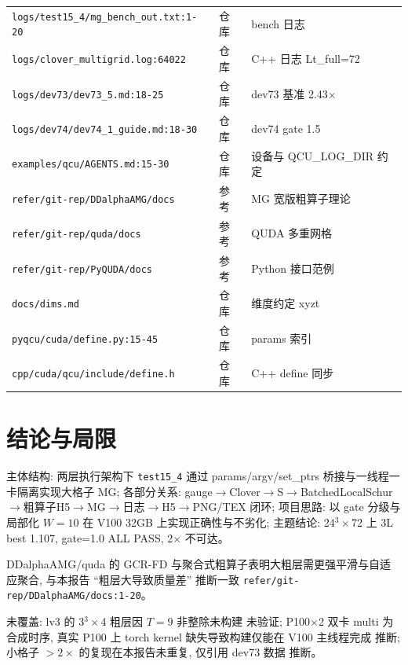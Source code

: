 \documentclass[UTF8]{ctexart}
\begin{document}
\begin{xltabular}{\textwidth}{llX}
\texttt{\nolinkurl{logs/test15_4/mg_bench_out.txt:1-20}} & 仓库 & bench 日志 \\
\texttt{\nolinkurl{logs/clover_multigrid.log:64022}} & 仓库 & C++ 日志 Lt\_full=72 \\
\texttt{\nolinkurl{logs/dev73/dev73_5.md:18-25}} & 仓库 & dev73 基准 2.43$\times$ \\
\texttt{\nolinkurl{logs/dev74/dev74_1_guide.md:18-30}} & 仓库 & dev74 gate 1.5 \\
\texttt{\nolinkurl{examples/qcu/AGENTS.md:15-30}} & 仓库 & 设备与 QCU\_LOG\_DIR 约定 \\
\texttt{\nolinkurl{refer/git-rep/DDalphaAMG/docs}} & 参考 & MG 宽版粗算子理论 \\
\texttt{\nolinkurl{refer/git-rep/quda/docs}} & 参考 & QUDA 多重网格 \\
\texttt{\nolinkurl{refer/git-rep/PyQUDA/docs}} & 参考 & Python 接口范例 \\
\texttt{\nolinkurl{docs/dims.md}} & 仓库 & 维度约定 xyzt \\
\texttt{\nolinkurl{pyqcu/cuda/define.py:15-45}} & 仓库 & params 索引 \\
\texttt{\nolinkurl{cpp/cuda/qcu/include/define.h}} & 仓库 & C++ define 同步 \\
\bottomrule
\end{xltabular}

\section{结论与局限}
\begin{conclbox}
主体结构: 两层执行架构下 \texttt{\nolinkurl{test15_4}} 通过 params/argv/set\_ptrs 桥接与一线程一卡隔离实现大格子 MG; 各部分关系: gauge$\to$Clover$\to$S$\to$BatchedLocalSchur$\to$粗算子H5$\to$MG$\to$日志$\to$H5$\to$PNG/TEX 闭环; 项目思路: 以 gate 分级与局部化 $W=10$ 在 V100 32GB 上实现正确性与不劣化; 主题结论: 24$^3\times$72 上 3L best 1.107, gate=1.0 ALL PASS, 2$\times$ 不可达。
\end{conclbox}
\begin{refbox}
DDalphaAMG/quda 的 GCR-FD 与聚合式粗算子表明大粗层需更强平滑与自适应聚合, 与本报告 ``粗层大导致质量差'' 推断一致 \textcolor{evidence}{\texttt{\nolinkurl{refer/git-rep/DDalphaAMG/docs:1-20}}}。
\end{refbox}
\begin{warnbox}
未覆盖: lv3 的 3$^3\times$4 粗层因 $T=9$ 非整除未构建 \textcolor{warn}{未验证}; P100$\times$2 双卡 multi 为合成时序, 真实 P100 上 torch kernel 缺失导致构建仅能在 V100 主线程完成 \textcolor{warn}{推断}; 小格子 $>2\times$ 的复现在本报告未重复, 仅引用 dev73 数据 \textcolor{warn}{推断}。
\end{warnbox}
\end{document}
